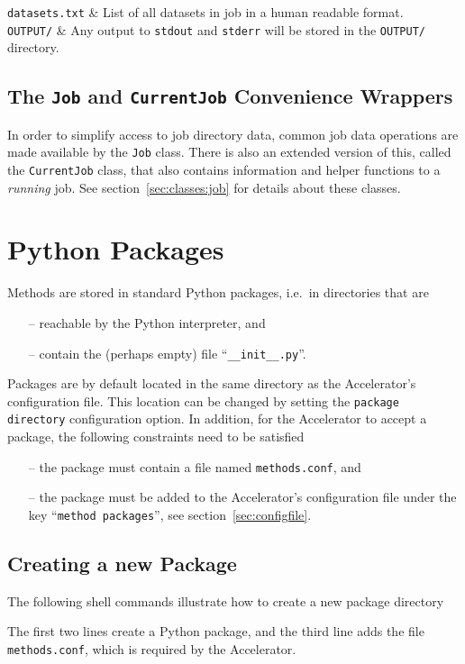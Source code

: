 \texttt{datasets.txt} & List of all datasets in job in a human
readable format.\\

\texttt{OUTPUT/} & Any output to \texttt{stdout} and \texttt{stderr} will be
stored in the \texttt{OUTPUT/} directory.\\
\stoptabletwo



\subsection{The \texttt{Job} and \texttt{CurrentJob} Convenience Wrappers}
In order to simplify access to job directory data, common job data
operations are made available by the \texttt{Job} class.  There is
also an extended version of this, called the \texttt{CurrentJob}
class, that also contains information and helper functions to a
\textsl{running} job.  See section~\ref{sec:classes:job} for details about
these classes.



\section{Python Packages}
Methods are stored in standard Python packages, i.e.\ in directories
that are
\begin{itemize}
\item[--] reachable by the Python interpreter, and
\item[--] contain the (perhaps empty) file ``\texttt{\_\_init\_\_.py}''.
\end{itemize}
Packages are by default located in the same directory as the
Accelerator's configuration file.  This location can be changed by
setting the \texttt{package directory} configuration option.  In
addition, for the Accelerator to accept a package, the following
constraints need to be satisfied
\begin{itemize}
\item[--] the package must contain a file named \texttt{methods.conf}, and
\item[--] the package must be added to the Accelerator's configuration file under the key ``\texttt{method packages}'', see section~\ref{sec:configfile}.
\end{itemize}



\subsection{Creating a new Package}
The following shell commands illustrate how to create a new package
directory
\begin{shell}
\end{shell}
The first two lines create a Python package, and the third line adds
the file \texttt{methods.conf}, which is required by the Accelerator.

